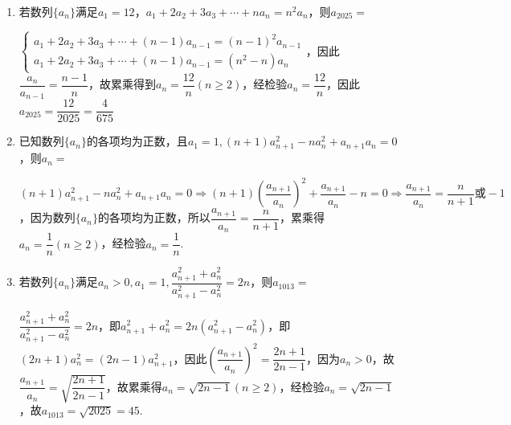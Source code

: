 \begin{enumerate}
\begin{enumerate}
        \begin{jieda}
            根据递推关系可知$a_n \neq 0$，故$\dfrac{a_n}{a_{n-1}} = \dfrac{n+1}{n-1}$，故累乘得到$a_n = n(n+1)(n \geq 2)$，经检验$a_n = n(n+1)$. 故$a_{30} = 930$，因此$n = 29$.
        \end{jieda}
        \item 若数列$\{a_n\}$满足$a_1 = 12$，$a_1 + 2a_2 + 3a_3 + \cdots + na_n = n^2a_n$，则$a_{2025} = $
        \begin{jieda}
            $\left \{ \begin{array}{l}
                 a_1 + 2a_2 + 3a_3 + \cdots + (n-1)a_{n-1} = (n-1)^2a_{n-1}  \\
                 a_1 + 2a_2 + 3a_3 + \cdots + (n-1)a_{n-1} = (n^2-n)a_n
            \end{array} \right.$，因此$\dfrac{a_n}{a_{n-1}} = \dfrac{n-1}{n}$，故累乘得到$a_n = \dfrac{12}{n} (n \geq 2)$，经检验$a_n = \dfrac{12}{n}$，因此$a_{2025} = \dfrac{12}{2025} = \dfrac{4}{675}$
        \end{jieda}
        \item 已知数列$\{a_n\}$的各项均为正数，且$a_1 = 1, (n+1)a_{n+1}^2 - na_n^2 + a_{n+1}a_n = 0$，则$a_n = $
        \begin{jieda}
            $(n+1)a_{n+1}^2 - na_n^2 + a_{n+1}a_n = 0 \Rightarrow (n+1)\left(\dfrac{a_{n+1}}{a_n}\right)^2 + \dfrac{a_{n+1}}{a_n} - n = 0 \Rightarrow \dfrac{a_{n+1}}{a_n} = \dfrac{n}{n+1} \mbox{或} -1$，因为数列$\{a_n\}$的各项均为正数，所以$\dfrac{a_{n+1}}{a_n} = \dfrac{n}{n+1}$，累乘得$a_n = \dfrac{1}{n} (n \geq 2)$，经检验$a_n = \dfrac{1}{n}$.
        \end{jieda}
        \item 若数列$\{a_n\}$满足$a_n > 0, a_1 = 1, \dfrac{a_{n+1}^2 + a_n^2}{a_{n+1}^2 - a_n^2} = 2n$，则$a_{1013} = $
        \begin{jieda}
            $\dfrac{a_{n+1}^2 + a_n^2}{a_{n+1}^2 - a_n^2} = 2n$，即$a_{n+1}^2 + a_n^2 = 2n(a_{n+1}^2 - a_n^2)$，即$(2n+1)a_n^2 = (2n-1)a_{n+1}^2$，因此$\left ( \dfrac{a_{n+1}}{a_n}\right)^2 = \dfrac{2n+1}{2n-1}$，因为$a_n > 0$，故$\dfrac{a_{n+1}}{a_n} = \sqrt{\dfrac{2n+1}{2n-1}}$，故累乘得$a_n = \sqrt{2n-1} (n \geq 2)$，经检验$a_n = \sqrt{2n-1}$，故$a_{1013} = \sqrt{2025} = 45$.
        \end{jieda}

\end{enumerate}
\end{enumerate}
